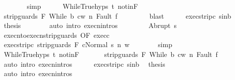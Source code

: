 \begin{isabellebody}
\ \ \ \ \ \ \isamarkupfalse%
\ simp\isanewline
\ \ \ \ \isamarkupfalse%
\ WhileTrue{\isachardot}hyps\ t\ notinF\ \isanewline
\ \ \ \ \isamarkupfalse%
\ {\isachardoublequoteopen}{\isasymGamma}{\isasymturnstile}{\isasymlangle}strip{\isacharunderscore}guards\ F\ {\isacharparenleft}While\ b\ c{\isacharparenright}{\isacharcomma}w{\isasymrangle}\ {\isacharequal}n{\isasymRightarrow}\ Fault\ f{\isachardoublequoteclose}\ \isanewline
\ \ \ \ \ \ \isamarkupfalse%
\ blast\isanewline
\ \ \ \ \isamarkupfalse%
\ exec{\isacharunderscore}strip{\isacharunderscore}c\ s{\isacharunderscore}in{\isacharunderscore}b\ \isamarkupfalse%
\ {\isacharquery}thesis\isanewline
\ \ \ \ \ \ \isamarkupfalse%
\ {\isacharparenleft}auto\ intro{\isacharcolon}\ execn{\isachardot}intros{\isacharparenright}\isanewline
\ \ \isamarkupfalse%
\isanewline
\ \ \ \ \isamarkupfalse%
\ {\isacharparenleft}Abrupt\ s{\isacharprime}{\isacharparenright}\isanewline
\ \ \ \ \isamarkupfalse%
\ execn{\isacharunderscore}to{\isacharunderscore}execn{\isacharunderscore}strip{\isacharunderscore}guards\ {\isacharbrackleft}OF\ exec{\isacharunderscore}c{\isacharbrackright}\ \isanewline
\ \ \ \ \isamarkupfalse%
\ exec{\isacharunderscore}strip{\isacharunderscore}c{\isacharcolon}\ {\isachardoublequoteopen}{\isasymGamma}{\isasymturnstile}{\isasymlangle}strip{\isacharunderscore}guards\ F\ c{\isacharcomma}Normal\ s{\isasymrangle}\ {\isacharequal}n{\isasymRightarrow}\ w{\isachardoublequoteclose}\isanewline
\ \ \ \ \ \ \isamarkupfalse%
\ simp\isanewline
\ \ \ \ \isamarkupfalse%
\ WhileTrue{\isachardot}hyps\ t\ notinF\ \isanewline
\ \ \ \ \isamarkupfalse%
\ {\isachardoublequoteopen}{\isasymGamma}{\isasymturnstile}{\isasymlangle}strip{\isacharunderscore}guards\ F\ {\isacharparenleft}While\ b\ c{\isacharparenright}{\isacharcomma}w{\isasymrangle}\ {\isacharequal}n{\isasymRightarrow}\ Fault\ f{\isachardoublequoteclose}\ \isanewline
\ \ \ \ \ \ \isamarkupfalse%
\ {\isacharparenleft}auto\ intro{\isacharcolon}\ execn{\isachardot}intros{\isacharparenright}\isanewline
\ \ \ \ \isamarkupfalse%
\ exec{\isacharunderscore}strip{\isacharunderscore}c\ s{\isacharunderscore}in{\isacharunderscore}b\ \isamarkupfalse%
\ {\isacharquery}thesis\isanewline
\ \ \ \ \ \ \isamarkupfalse%
\ {\isacharparenleft}auto\ intro{\isacharcolon}\ execn{\isachardot}intros{\isacharparenright}\isanewline

\end{isabellebody}
